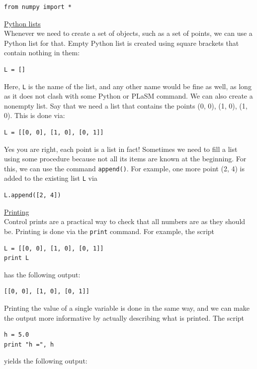 \documentclass{article}
\begin{document}
\begin{verbatim}
from numpy import *
\end{verbatim} 
\vspace{4mm}
\underline{Python lists}\\

\noindent
Whenever we need to create a set of objects, such as a set of points, we can use 
a Python list for that. Empty Python list is created using square brackets that 
contain nothing in them:

\begin{verbatim}
L = []
\end{verbatim} 
Here, {\tt L} is the name of the list, and any other name would be fine as well, 
as long as it does not clash with some Python or PLaSM command. We can also create 
a nonempty list. Say that we need a list that contains the points (0, 0), (1, 0),
(1, 0). This is done via:

\begin{verbatim}
L = [[0, 0], [1, 0], [0, 1]]
\end{verbatim} 
Yes you are right, each point is a list in fact! Sometimes we need to fill 
a list using some procedure because not all its items are known at the
beginning. For this, we can use the command {\tt append()}. For example,
one more point (2, 4) is added to the existing list {\tt L} via

\begin{verbatim}
L.append([2, 4])
\end{verbatim} 
\vspace{4mm}
\underline{Printing}\\

\noindent
Control prints are a practical way to check that all numbers are as they should be.
Printing is done via the {\tt print} command. For example, the script

\begin{verbatim}
L = [[0, 0], [1, 0], [0, 1]]
print L
\end{verbatim} 
has the following output:

\begin{verbatim}
[[0, 0], [1, 0], [0, 1]]
\end{verbatim} 
Printing the value of a single variable is done in the same way, and we can 
make the output more informative by actually describing what is printed.
The script

\begin{verbatim}
h = 5.0
print "h =", h
\end{verbatim} 
yields the following output:
\end{document}

